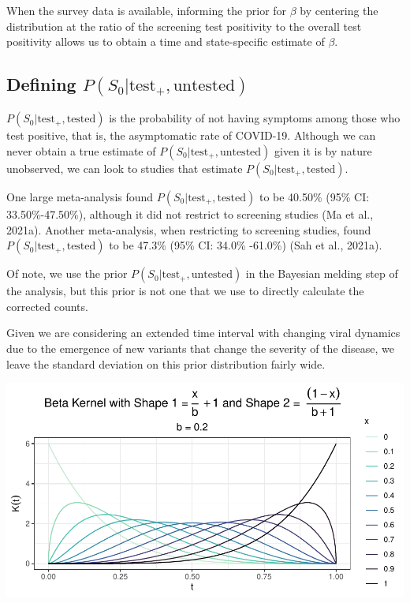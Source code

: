 \documentclass[12pt,twoside]{smiththesis}
\begin{document}
When the survey data is available, informing the prior for \(\beta\) by centering the distribution at the ratio of the screening test positivity to the overall test positivity allows us to obtain a time and state-specific estimate of \(\beta\).

\hypertarget{defining-ps_0texttest_textuntested}{%
\subsection{\texorpdfstring{Defining \(P(S_0|\text{test}_+,\text{untested})\)}{Defining P(S\_0\textbar\textbackslash text\{test\}\_+,\textbackslash text\{untested\})}}\label{defining-ps_0texttest_textuntested}}

\(P(S_0|\text{test}_+,\text{tested})\) is the probability of not having symptoms among those who test positive, that is, the asymptomatic rate of COVID-19. Although we can never obtain a true estimate of \(P(S_0|\text{test}_+,\text{untested})\) given it is by nature unobserved, we can look to studies that estimate \(P(S_0|\text{test}_+,\text{tested})\).

One large meta-analysis found \(P(S_0|\text{test}_+,\text{tested})\) to be 40.50\% (95\% CI: 33.50\%-47.50\%), although it did not restrict to screening studies (Ma et al., 2021a). Another meta-analysis, when restricting to screening studies, found \(P(S_0|\text{test}_+,\text{tested})\) to be 47.3\% (95\% CI: 34.0\% -61.0\%) (Sah et al., 2021a).

Of note, we use the prior \(P(S_0|\text{test}_+,\text{untested})\) in the Bayesian melding step of the analysis, but this prior is not one that we use to directly calculate the corrected counts.

Given we are considering an extended time interval with changing viral dynamics due to the emergence of new variants that change the severity of the disease, we leave the standard deviation on this prior distribution fairly wide.
\begin{center}\includegraphics[width=0.8\linewidth]{thesis_files/figure-latex/unnamed-chunk-46-1} \end{center}
\end{document}
